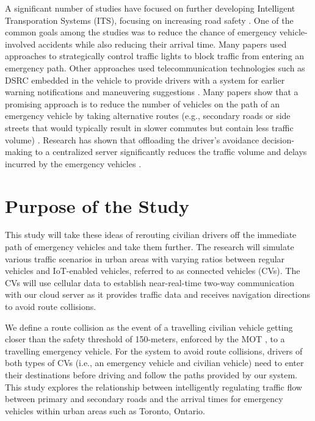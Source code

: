 A significant number of studies have focused on further developing Intelligent Transporation Systems (ITS), focusing on increasing road safety \cite{Rizvi2007}. One of the common goals among the studies was to reduce the chance of emergency vehicle-involved accidents while also reducing their arrival time. Many papers used approaches to strategically control traffic lights to block traffic from entering an emergency path. Other approaches used telecommunication technologies such as DSRC embedded in the vehicle to provide drivers with a system for earlier warning notifications and maneuvering suggestions \cite{Huang2009}. Many papers show that a promising approach is to reduce the number of vehicles on the path of an emergency vehicle by taking alternative routes (e.g., secondary roads or side streets that would typically result in slower commutes but contain less traffic volume) \cite{Huang2009}. Research has shown that offloading the driver's avoidance decision-making to a centralized server significantly reduces the traffic volume and delays incurred by the emergency vehicles \cite{Huang2009}.

\section{Purpose of the Study}
This study will take these ideas of rerouting civilian drivers off the immediate path of emergency vehicles and take them further. The research will simulate various traffic scenarios in urban areas with varying ratios between regular vehicles and IoT-enabled vehicles, referred to as connected vehicles (CVs). The CVs will use cellular data to establish near-real-time two-way communication with our cloud server as it provides traffic data and receives navigation directions to avoid route collisions.

We define a route collision as the event of a travelling civilian vehicle getting closer than the safety threshold of 150-meters, enforced by the MOT \cite{MoveOver_2021, MTO_2020}, to a travelling emergency vehicle. For the system to avoid route collisions, drivers of both types of CVs (i.e., an emergency vehicle and civilian vehicle) need to enter their destinations before driving and follow the paths provided by our system. This study explores the relationship between intelligently regulating traffic flow between primary and secondary roads and the arrival times for emergency vehicles within urban areas such as Toronto, Ontario.


